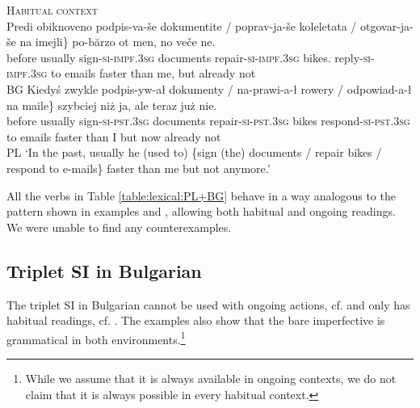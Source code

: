\documentclass[output=paper,colorlinks,citecolor=brown]{langscibook}
\begin{document}
\ea \label{habitual:pair:BG+PL:past} \textsc{Habitual context}\\
%
\ea \gll Predi obiknoveno	\minsp{\{} podpis-va-še dokumentite / poprav-ja-še koleletata / otgovar-ja-še na imejli\}	po-bărzo 	ot 	men,  no  veče 	ne.  \\
before usually {}  sign-\textsc{si}-\textsc{impf.3sg} documents {} repair-\textsc{si}-\textsc{impf.3sg} bikes.{\DEF} {} reply-\textsc{si}-\textsc{impf.3sg} to emails faster 	    	than 	me,
but already not\\\hfill BG
%
\ex \gll	Kiedyś zwykle	\minsp{\{} podpis-yw-ał dokumenty / na-prawi-a-ł rowery / odpowiad-a-ł na maile\} 	szybciej niż 	ja, ale 	teraz 	już 		nie. \\
before usually	{}	sign-\textsc{si}-\textsc{pst.3sg} documents {} repair-\textsc{si}-\textsc{pst.3sg} bikes {} respond-\textsc{si}-\textsc{pst.3sg} to emails faster 	  than 	I but 	now 	already 	not\\\hfill PL
\glt `In the past, usually he (used to) \{sign (the) documents / repair bikes / respond to e-mails\} faster than me but not anymore.'
%
%
\z
\z




 
\noindent All the verbs in Table \ref{table:lexical:PL+BG} behave in a way analogous to the pattern shown in examples  and , allowing both habitual and ongoing readings. We were unable to find any counterexamples. 



\subsection{Triplet SI in Bulgarian}

The triplet SI in Bulgarian cannot be used with ongoing actions, cf.  and only has habitual readings, cf. . 
The examples also show that the bare imperfective is grammatical in both environments.\footnote{While we assume that it is always available in ongoing contexts, we do not claim that it is always possible in every habitual context. }
\end{document}
